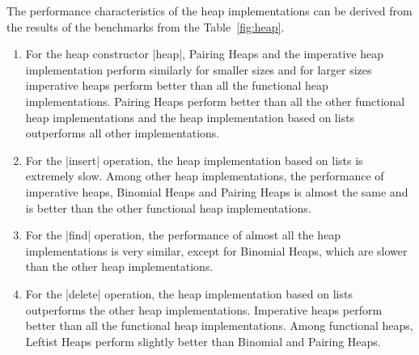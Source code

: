 The performance characteristics of the heap implementations can be
derived from the results of the benchmarks from the
Table~\ref{fig:heap}.

\begin{enumerate}
\item{For the heap constructor \scheme|heap|, Pairing Heaps and the
  imperative heap implementation perform similarly for smaller sizes and
  for larger sizes imperative heaps perform better than all the
  functional heap implementations. Pairing Heaps perform better than all
  the other functional heap implementations and the heap implementation
  based on lists outperforms all other implementations.}
\item{For the \scheme|insert| operation, the heap implementation based
  on lists is extremely slow. Among other heap implementations, the
  performance of imperative heaps, Binomial Heaps and Pairing Heaps is
  almost the same and is better than the other functional heap
  implementations.}
\item{For the \scheme|find| operation, the performance of almost all the
  heap implementations is very similar, except for Binomial Heaps, which
  are slower than the other heap implementations.}
\item{For the \scheme|delete| operation, the heap implementation based
  on lists outperforms the other heap implementations. Imperative heaps
  perform better than all the functional heap implementations. Among
  functional heaps, Leftist Heaps perform slightly better than Binomial
  and Pairing Heaps.}
\end{enumerate}

